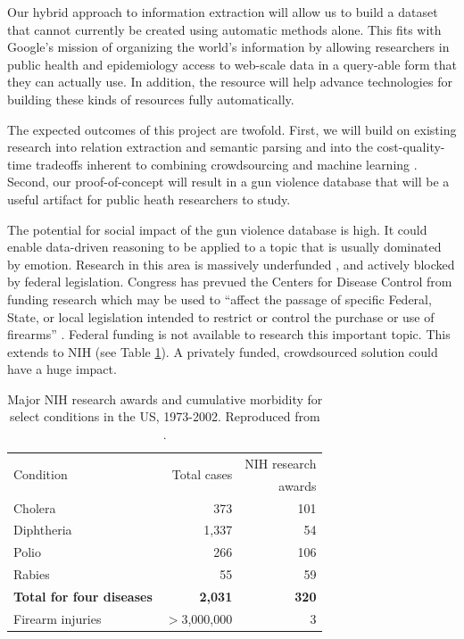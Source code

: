 \documentclass[11pt]{article}
\begin{document}

Our hybrid approach to information extraction will allow us to build a dataset that cannot currently be created using automatic methods alone. This fits with Google's mission of organizing the world's information by allowing researchers in public health and epidemiology access to web-scale data in a query-able form that they can actually use. In addition, the resource will help advance technologies for building these kinds of resources fully automatically. 

The expected outcomes of this project are twofold.  First, we will build on existing research into relation extraction and semantic parsing \cite{mintz2009distant,cai2013semantic,yao2014information} and into the cost-quality-time tradeoffs inherent to combining crowdsourcing and machine learning \cite{Quinn11human-machinehybrid,Lin-et-al:HCOMP:2014}.  Second, our proof-of-concept will result in a gun violence database that will be a useful artifact for public heath researchers to study.

The potential for social impact of the gun violence database is high. It could enable data-driven reasoning to be applied to a topic that is usually dominated by emotion.   Research in this area is massively underfunded \cite{roth1993understanding}, and actively blocked by federal legislation.  Congress has prevued the Centers for Disease Control  from funding research which may be used to ``affect the passage of specific Federal, State, or local legislation intended to restrict or control the purchase or use of firearms'' \cite{kassirer1995partisan}.   Federal funding is not available to research this important topic.  This extends to NIH (see Table \ref{nih}).  A privately funded, crowdsourced solution could have a huge impact.

\begin{table}
\centering
\footnotesize
\begin{tabular}{lrr}
\hline\hline
\multirow{2}{*}{Condition} & \multirow{2}{*}{Total cases} & \multirow{1}{*}{NIH research}\\
&& \multirow{1}{*}{awards}\\\hline
Cholera & 373 & 101 \\
Diphtheria & 1,337 & 54 \\
Polio & 266 & 106 \\
Rabies & 55 & 59 \\
\textbf{Total for four diseases} & \textbf{2,031} & \textbf{320} \\
Firearm injuries & $>$3,000,000 & 3 \\
\hline\hline
\end{tabular}
\label{nih}
\caption{Major NIH research awards and cumulative morbidity for select conditions in the US, 1973-2002. Reproduced from .}
\end{table}
\end{document}
